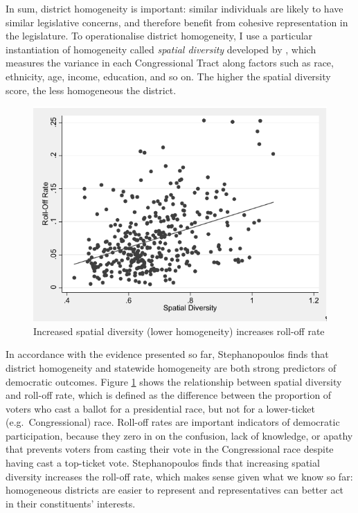 \documentclass[]{article}
\begin{document}
In sum, district homogeneity is important: similar individuals are
likely to have similar legislative concerns, and therefore benefit from
cohesive representation in the legislature. To operationalise district
homogeneity, I use a particular instantiation of homogeneity called
\emph{spatial diversity} developed by \cite{Stephanopoulos}, which
measures the variance in each Congressional Tract along factors such as
race, ethnicity, age, income, education, and so on. The higher the
spatial diversity score, the less homogeneous the district.

\begin{figure}
\centering
\includegraphics{img/sd_rolloff.png}
\caption{Increased spatial diversity (lower homogeneity) increases
roll-off rate \label{sd_rolloff}}
\end{figure}

In accordance with the evidence presented so far, Stephanopoulos finds
that district homogeneity and statewide homogeneity are both strong
predictors of democratic outcomes. Figure \ref{sd_rolloff} shows the
relationship between spatial diversity and roll-off rate, which is
defined as the difference between the proportion of voters who cast a
ballot for a presidential race, but not for a lower-ticket
(e.g.~Congressional) race. Roll-off rates are important indicators of
democratic participation, because they zero in on the confusion, lack of
knowledge, or apathy that prevents voters from casting their vote in the
Congressional race despite having cast a top-ticket vote. Stephanopoulos
finds that increasing spatial diversity increases the roll-off rate,
which makes sense given what we know so far: homogeneous districts are
easier to represent and representatives can better act in their
constituents' interests.
\end{document}
